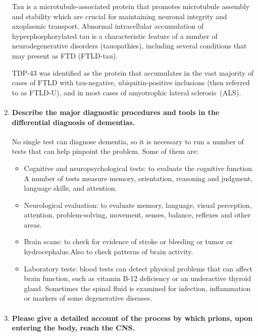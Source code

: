 \documentclass[12pt,article,oneside,a4paper]{memoir}
\begin{document}
\begin{enumerate}
Tau is a microtubule-associated protein that promotes microtubule assembly and
stability which are crucial for maintaining neuronal integrity and axoplasmic
transport. Abnormal intracellular accumulation of hyperphosphorylated tau is a
characteristic feature of a number of neurodegenerative disorders
(tauopathies), including several conditions that may present as FTD (FTLD-tau).

TDP-43 was identified as the protein that accumulates in the vast majority of
cases of FTLD with tau-negative, ubiquitin-positive inclusions (then referred
to as FTLD-U), and in most cases of amyotrophic lateral sclerosis~(ALS).

\item \paragraph{Describe the major diagnostic procedures and tools in the
differential diagnosis of dementias.}

No single test can diagnose dementia, so it is necessary to run a number of
tests that can help pinpoint the problem. Some of them are:
\begin{itemize}
\item Cognitive and neuropsychological tests: to evaluate the cognitive
function. A number of tests measure memory, orientation, reasoning and
judgment, language skills, and attention.
\item Neurological evaluation: to evaluate memory, language, visual perception,
attention, problem-solving, movement, senses, balance, reflexes and other
areas.
\item Brain scans: to check for evidence of stroke or bleeding or tumor or
hydrocephalus.Also to check patterns of brain activity.
\item Laboratory tests: blood tests can detect physical problems that can
affect brain function, such as vitamin B-12 deficiency or an underactive
thyroid gland. Sometimes the spinal fluid is examined for infection,
inflammation or markers of some degenerative diseases.
\end{itemize}

\item \paragraph{Please give a detailed account of the process by which prions,
upon entering the body, reach the CNS.}


\end{enumerate}
\end{document}
